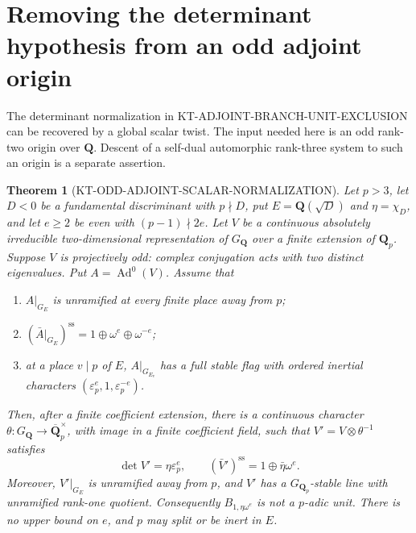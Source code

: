 \documentclass[11pt,a4paper]{article}
\newtheorem{theorem}{Theorem}[section]
\theoremstyle{definition}
\begin{document}
\section{Removing the determinant hypothesis from an odd adjoint origin}
\label{sec:kt-odd-adjoint-scalar-normalization}

The determinant normalization in
KT-ADJOINT-BRANCH-UNIT-EXCLUSION can be recovered by a global scalar
twist.  The input needed here is an odd rank-two origin over
$\mathbf Q$.  Descent of a self-dual automorphic rank-three system to
such an origin is a separate assertion.

\begin{theorem}[KT-ODD-ADJOINT-SCALAR-NORMALIZATION]
Let $p>3$, let $D<0$ be a fundamental discriminant with $p\nmid D$,
put $E=\mathbf Q(\sqrt D)$ and $\eta=\chi_D$, and let $e\ge2$ be
even with $(p-1)\nmid2e$.  Let $V$ be a continuous absolutely
irreducible two-dimensional representation of $G_{\mathbf Q}$ over
a finite extension of $\mathbf Q_p$.  Suppose $V$ is projectively
odd: complex conjugation acts with two distinct eigenvalues.
Put $A=\operatorname{Ad}^0(V)$.  Assume that
\begin{enumerate}
\item $A|_{G_E}$ is unramified at every finite place away from $p$;
\item $(\bar A|_{G_E})^{\mathrm{ss}}
       =1\oplus\omega^e\oplus\omega^{-e}$;
\item at a place $v\mid p$ of $E$, $A|_{G_{E_v}}$ has a full stable
      flag with ordered inertial characters
      $(\varepsilon_p^e,1,\varepsilon_p^{-e})$.
\end{enumerate}
Then, after a finite coefficient extension, there is a continuous
character $\theta:G_{\mathbf Q}\to\overline{\mathbf Q}_p^{\times}$,
with image in a finite coefficient field, such that
$V'=V\otimes\theta^{-1}$ satisfies
\[
 \det V'=\eta\varepsilon_p^e,\qquad
 (\bar V')^{\mathrm{ss}}=1\oplus\bar\eta\omega^e.       \tag{SN.1}
\]
Moreover, $V'|_{G_E}$ is unramified away from $p$, and $V'$ has a
$G_{\mathbf Q_p}$-stable line with unramified rank-one quotient.
Consequently $B_{1,\eta\omega^e}$ is not a $p$-adic unit.
There is no upper bound on $e$, and $p$ may split or be inert in $E$.
\end{theorem}
\end{document}
